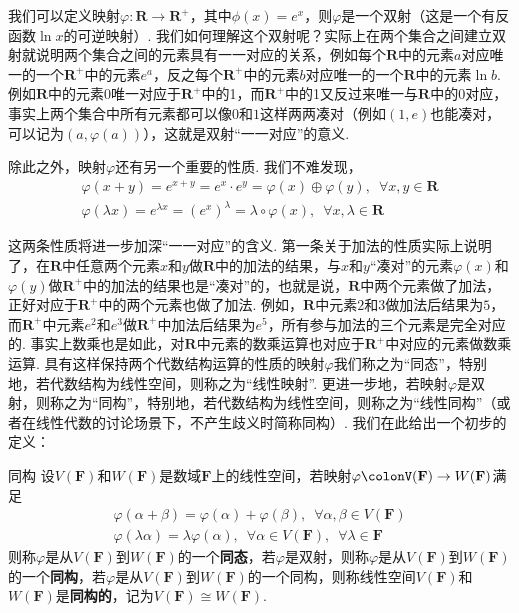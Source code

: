 我们可以定义映射$\varphi\colon\mathbf{R}\to\mathbf{R}^+$，其中$\phi(x)=e^x$，则$\varphi$是一个双射（这是一个有反函数$\ln x$的可逆映射）. 我们如何理解这个双射呢？实际上在两个集合之间建立双射就说明两个集合之间的元素具有一一对应的关系，例如每个$\mathbf{R}$中的元素$a$对应唯一的一个$\mathbf{R}^+$中的元素$e^a$，反之每个$\mathbf{R}^+$中的元素$b$对应唯一的一个$\mathbf{R}$中的元素$\ln b$. 例如$\mathbf{R}$中的元素$0$唯一对应于$\mathbf{R}^+$中的1，而$\mathbf{R}^+$中的1又反过来唯一与$\mathbf{R}$中的$0$对应，事实上两个集合中所有元素都可以像$0$和$1$这样两两凑对（例如$(1,e)$也能凑对，可以记为$(a,\varphi(a))$），这就是双射``一一对应''的意义.

除此之外，映射$\varphi$还有另一个重要的性质. 我们不难发现，
\begin{gather*}
    \varphi(x+y)=e^{x+y}=e^x\cdot e^y=\varphi(x)\oplus\varphi(y),\enspace\forall x,y\in\mathbf{R} \\
    \varphi(\lambda x)=e^{\lambda x}=(e^x)^\lambda=\lambda\circ\varphi(x),\enspace\forall x,\lambda\in\mathbf{R}
\end{gather*}

这两条性质将进一步加深``一一对应''的含义. 第一条关于加法的性质实际上说明了，在$\mathbf{R}$中任意两个元素$x$和$y$做$\mathbf{R}$中的加法的结果，与$x$和$y$``凑对''的元素$\varphi(x)$和$\varphi(y)$做$\mathbf{R}^+$中的加法的结果也是``凑对''的，也就是说，$\mathbf{R}$中两个元素做了加法，正好对应于$\mathbf{R}^+$中的两个元素也做了加法. 例如，$\mathbf{R}$中元素$2$和$3$做加法后结果为$5$，而$\mathbf{R}^+$中元素$e^2$和$e^3$做$\mathbf{R}^+$中加法后结果为$e^5$，所有参与加法的三个元素是完全对应的. 事实上数乘也是如此，对$\mathbf{R}$中元素的数乘运算也对应于$\mathbf{R}^+$中对应的元素做数乘运算. 具有这样保持两个代数结构运算的性质的映射$\varphi$我们称之为``同态''，特别地，若代数结构为线性空间，则称之为``线性映射''. 更进一步地，若映射$\varphi$是双射，则称之为``同构''，特别地，若代数结构为线性空间，则称之为``线性同构''（或者在线性代数的讨论场景下，不产生歧义时简称同构）. 我们在此给出一个初步的定义：
\begin{definition}{}{同构}
    设$V(\mathbf{F})$和$W(\mathbf{F})$是数域$\mathbf{F}$上的线性空间，若映射$\varphi\colonV(\mathbf{F})\to W(\mathbf{F})$满足
    \begin{gather*}
        \varphi(\alpha+\beta)=\varphi(\alpha)+\varphi(\beta),\enspace\forall\alpha,\beta\in V(\mathbf{F}) \\
        \varphi(\lambda\alpha)=\lambda\varphi(\alpha),\enspace\forall\alpha\in V(\mathbf{F}),\enspace\forall\lambda\in\mathbf{F}
    \end{gather*}
    则称$\varphi$是从$V(\mathbf{F})$到$W(\mathbf{F})$的一个\textbf{同态}，若$\varphi$是双射，则称$\varphi$是从$V(\mathbf{F})$到$W(\mathbf{F})$的一个\textbf{同构}，若$\varphi$是从$V(\mathbf{F})$到$W(\mathbf{F})$的一个同构，则称线性空间$V(\mathbf{F})$和$W(\mathbf{F})$是\textbf{同构的}，记为$V(\mathbf{F})\cong W(\mathbf{F})$.
\end{definition}

